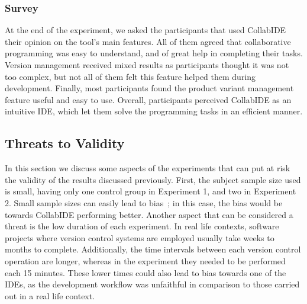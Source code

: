 \subsubsection{Survey}
At the end of the experiment, we asked the participants that used CollabIDE their opinion on the tool's 
main features. All of them agreed that collaborative programming was easy to understand, and of great 
help in completing their tasks. Version management received mixed results as participants thought it 
was not too complex, but not all of them felt this feature helped them during development. Finally, most participants found the product variant management feature useful and easy to use. Overall, 
participants perceived CollabIDE as an intuitive IDE, which let them solve the programming tasks in an 
efficient manner. 

\subsection{Threats to Validity}
In this section we discuss some aspects of the experiments that can put at risk the validity of the 
results discussed previously. First, the subject sample size used is small, having only one control group 
in Experiment 1, and two in Experiment 2. Small sample sizes can easily lead to 
bias~\cite{threatstoval}; in this case, the bias would be towards CollabIDE performing better. Another 
aspect that can be considered a threat is the low duration of each experiment. In real life contexts, 
software projects where version control systems are employed usually take weeks to months to 
complete. Additionally, the time intervals between each version control operation are longer, whereas 
in the experiment they needed to be performed each 15 minutes. These lower times could also lead to 
bias towards one of the IDEs, as the development workflow was unfaithful in comparison to those 
carried out in a real life context. 


\endinput

